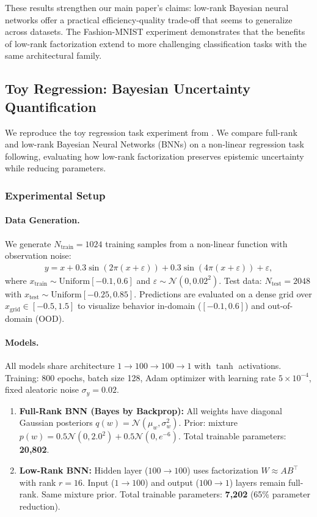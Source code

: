 \documentclass{article}
\theoremstyle{plain}
\theoremstyle{definition}
\theoremstyle{remark}
\begin{document}
These results strengthen our main paper's claims: low-rank Bayesian neural networks offer a practical efficiency-quality trade-off that seems to generalize across datasets. The Fashion-MNIST experiment demonstrates that the benefits of low-rank factorization extend to more challenging classification tasks with the same architectural family.
\subsection{Toy Regression: Bayesian Uncertainty Quantification}
\label{app:toy_regression}
We reproduce the toy regression task experiment from \cite{blundell2015weight}. 
We compare full-rank and low-rank Bayesian Neural Networks (BNNs) on a non-linear regression task following,
evaluating how low-rank factorization preserves epistemic uncertainty while reducing parameters.

\subsubsection{Experimental Setup}

\paragraph{Data Generation.} 
We generate $N_{\text{train}} = 1024$ training samples from a non-linear function with observation noise:
\begin{align}
y = x + 0.3\sin(2\pi(x + \varepsilon)) + 0.3\sin(4\pi(x + \varepsilon)) + \varepsilon,
\end{align}
where $x_{\text{train}} \sim \text{Uniform}[-0.1, 0.6]$ and $\varepsilon \sim \mathcal{N}(0, 0.02^2)$.
Test data: $N_{\text{test}} = 2048$ with $x_{\text{test}} \sim \text{Uniform}[-0.25, 0.85]$.
Predictions are evaluated on a dense grid over $x_{\text{grid}} \in [-0.5, 1.5]$ to visualize behavior in-domain 
($[-0.1, 0.6]$) and out-of-domain (OOD).

\paragraph{Models.}
All models share architecture $1 \to 100 \to 100 \to 1$ with $\tanh$ activations.
Training: 800 epochs, batch size 128, Adam optimizer with learning rate $5 \times 10^{-4}$, fixed aleatoric noise $\sigma_y = 0.02$.

\begin{enumerate}
\item \textbf{Full-Rank BNN (Bayes by Backprop):} All weights have diagonal Gaussian posteriors 
  $q(w) = \mathcal{N}(\mu_w, \sigma_w^2)$. Prior: mixture $p(w) = 0.5 \mathcal{N}(0, 2.0^2) + 0.5 \mathcal{N}(0, e^{-6})$.
  Total trainable parameters: \textbf{20,802}.
  
\item \textbf{Low-Rank BNN:} Hidden layer ($100 \to 100$) uses factorization $W \approx AB^\top$ with rank $r=16$.
  Input ($1 \to 100$) and output ($100 \to 1$) layers remain full-rank. Same mixture prior.
  Total trainable parameters: \textbf{7,202} (65\% parameter reduction).
\end{enumerate}
\end{document}
